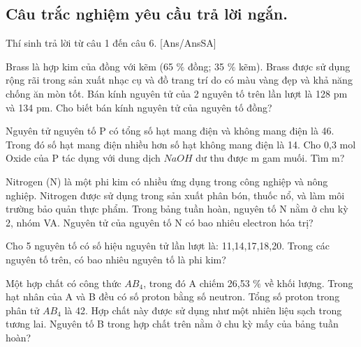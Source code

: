 \subsection{Câu trắc nghiệm yêu cầu trả lời ngắn.} Thí sinh trả lời từ câu 1 đến câu 6.
[Ans/AnsSA]
\setcounter{bt}{0}
\begin{bt}
	Brass là hợp kim của đồng với kẽm (65 $\%$ đồng; 35 $\%$ kẽm). Brass được sử dụng rộng rãi trong sản xuất nhạc cụ và đồ trang trí do có màu vàng đẹp và khả năng chống ăn mòn tốt. Bán kính nguyên tử của 2 nguyên tố trên lần lượt là 128 pm và 134 pm. Cho biết bán kính nguyên tử của nguyên tố đồng?
	\shortans{}
	\loigiai{}
\end{bt}

\begin{bt}
	Nguyên tử nguyên tố P có tổng số hạt mang điện và không mang điện là 46. Trong đó số hạt mang điện nhiều hơn số hạt không mang điện là 14. Cho 0{,}3 mol Oxide của P tác dụng với dung dịch $NaOH$ dư thu được m gam muối. Tìm m?
	\shortans{}
	\loigiai{}
\end{bt}

\begin{bt}
	Nitrogen (N) là một phi kim có nhiều ứng dụng trong công nghiệp và nông nghiệp. Nitrogen được sử dụng trong sản xuất phân bón, thuốc nổ, và làm môi trường bảo quản thực phẩm. Trong bảng tuần hoàn, nguyên tố N nằm ở chu kỳ 2, nhóm VA. Nguyên tử của nguyên tố N có bao nhiêu electron hóa trị?
	\shortans{}
	\loigiai{}
\end{bt}

\begin{bt}
	Cho 5 nguyên tố có số hiệu nguyên tử lần lượt là: 11,14,17,18,20. Trong các nguyên tố trên, có bao nhiêu nguyên tố là phi kim?
	\shortans{}
	\loigiai{}
\end{bt}

\begin{bt}
	Một hợp chất có công thức $AB_4$, trong đó A chiếm 26{,}53 $\%$ về khối lượng. Trong hạt nhân của A và B đều có số proton bằng số neutron. Tổng số proton trong phân tử $AB_4$ là 42. Hợp chất này được sử dụng như một nhiên liệu sạch trong tương lai. Nguyên tố B trong hợp chất trên nằm ở chu kỳ mấy của bảng tuần hoàn?
	\shortans{}
	\loigiai{}
\end{bt}


